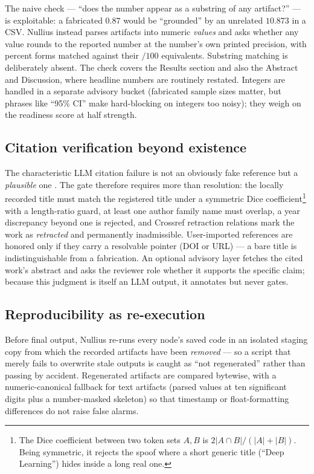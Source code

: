 \documentclass[11pt]{article}
\begin{document}
The naive check --- ``does the number appear as a substring of any artifact?'' --- is exploitable: a fabricated $0.87$ would be ``grounded'' by an unrelated $10.873$ in a CSV. Nullius instead parses artifacts into numeric \emph{values} and asks whether any value rounds to the reported number at the number's own printed precision, with percent forms matched against their $/100$ equivalents. Substring matching is deliberately absent. The check covers the Results section and also the Abstract and Discussion, where headline numbers are routinely restated. Integers are handled in a separate advisory bucket (fabricated sample sizes matter, but phrases like ``95\% CI'' make hard-blocking on integers too noisy); they weigh on the readiness score at half strength.

\subsection{Citation verification beyond existence}

The characteristic LLM citation failure is not an obviously fake reference but a \emph{plausible} one \cite{beel2025}. The gate therefore requires more than resolution: the locally recorded title must match the registered title under a symmetric Dice coefficient\footnote{The Dice coefficient between two token sets $A,B$ is $2|A\cap B|/(|A|+|B|)$. Being symmetric, it rejects the spoof where a short generic title (``Deep Learning'') hides inside a long real one.} with a length-ratio guard, at least one author family name must overlap, a year discrepancy beyond one is rejected, and Crossref retraction relations mark the work as \emph{retracted} and permanently inadmissible. User-imported references are honored only if they carry a resolvable pointer (DOI or URL) --- a bare title is indistinguishable from a fabrication. An optional advisory layer fetches the cited work's abstract and asks the reviewer role whether it supports the specific claim; because this judgment is itself an LLM output, it annotates but never gates.

\subsection{Reproducibility as re-execution}

Before final output, Nullius re-runs every node's saved code in an isolated staging copy from which the recorded artifacts have been \emph{removed} --- so a script that merely fails to overwrite stale outputs is caught as ``not regenerated'' rather than passing by accident. Regenerated artifacts are compared bytewise, with a numeric-canonical fallback for text artifacts (parsed values at ten significant digits plus a number-masked skeleton) so that timestamp or float-formatting differences do not raise false alarms.
\end{document}
